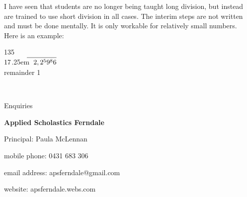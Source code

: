 \documentclass{article}
\newcommand\mylongdiv[2]{%
$\strut#1$\kern.25em\smash{\raise.3ex\hbox{$\big)$}}$\mkern-8mu
        \overline{\quad\strut#2}$}
\begin{document}
I have seen that students are no longer being taught long division, but instead are trained to use short division in all cases. The interim steps are not written and must be done mentally. It is only workable for relatively small numbers.\\

Here is an example:\\

\begin{center}
\hspace{6.5ex}1\hspace{0.8ex}3\hspace{0.8ex}5\\
\mylongdiv{17}{2,2{^5}9{^8}6}\\
remainder 1
\end{center}

\newpage
\

\begin{center}
\linespread{2}\large

Enquiries

\textbf{Applied Scholastics Ferndale}

Principal: Paula McLennan

mobile phone: 0431 683 306

email address: apsferndale@gmail.com

website: apsferndale.webs.com
\end{center}
\end{document}
